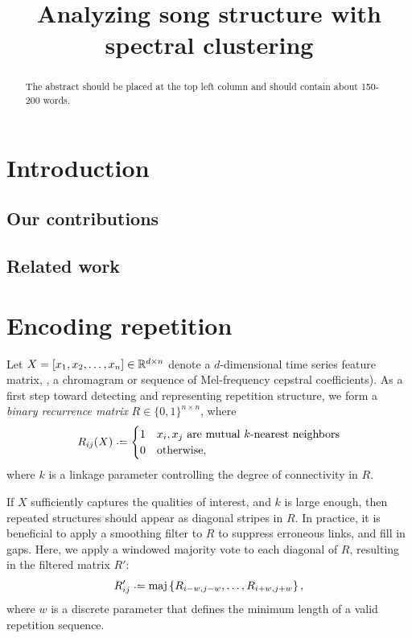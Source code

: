 \documentclass{article}
\title{Analyzing song structure with spectral clustering}
\begin{document}
%
\maketitle
%
\begin{abstract}
The abstract should be placed at the top left column and should contain about 150-200 words.
\end{abstract}
%
\section{Introduction}\label{sec:introduction}

\subsection{Our contributions}

\subsection{Related work}

\cite{serra2012unsupervised}

\cite{grohganz2013converting}

\section{Encoding repetition}

Let $X = [x_1, x_2, \dots, x_n] \in \mathbb{R}^{d\times n}$ denote a $d$-dimensional time
series feature matrix, \eg, a chromagram or sequence of Mel-frequency cepstral 
coefficients).  As a first step toward detecting and representing repetition structure, 
we form a \emph{binary recurrence matrix} $R \in \{0,1\}^{n\times n}$, where 
\begin{equation}
R_{ij}(X) \defeq \begin{cases}
1 & x_i, x_j \text{ are mutual $k$-nearest neighbors}\\
0 & \text{otherwise},
\end{cases}
\end{equation}
where $k$ is a linkage parameter controlling the degree of connectivity in $R$.


If $X$ sufficiently captures the qualities of interest, and $k$ is large
enough, then repeated structures should appear as diagonal stripes in $R$.
In practice, it is beneficial to apply a smoothing filter to $R$ to suppress erroneous
links, and fill in gaps.  Here, we apply a windowed majority vote to each diagonal of
$R$, resulting in the filtered matrix $R'$:
\begin{equation}
R'_{ij} \defeq \maj\left\{ R_{i-w, j-w}, \dots, R_{i+w, j+w}\right\},
\label{filtered-rep}
\end{equation}
where $w$ is a discrete parameter that defines the minimum length of a valid
repetition sequence.
\end{document}
